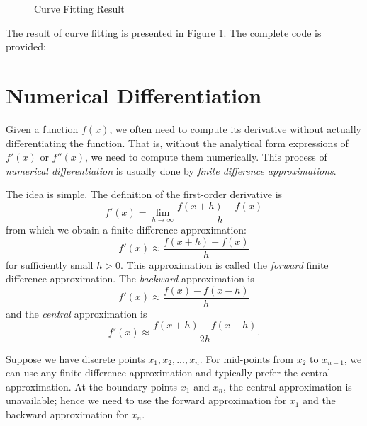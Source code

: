 \begin{figure}
\caption{Curve Fitting Result \label{fig:curve_fit}}
\end{figure}

The result of curve fitting is presented in Figure \ref{fig:curve_fit}. The complete code is provided:
\begin{codelisting}
\end{codelisting}






\section{Numerical Differentiation}

Given a function $f(x)$, we often need to compute its derivative without actually differentiating the function. That is, without the analytical form expressions of $f'(x)$ or $f''(x)$, we need to compute them numerically. This process of \emph{numerical differentiation} is usually done by \emph{finite difference approximations}.

The idea is simple. The definition of the first-order derivative is
\[
	f'(x) = \lim_{h \to \infty} \frac{f(x+h)-f(x)}{h}
\]
from which we obtain a finite difference approximation:
\[
	f'(x) \approx \frac{f(x+h)-f(x)}{h}
\]
for sufficiently small $h>0$. This approximation is called the \emph{forward} finite difference approximation. The \emph{backward} approximation is
\[
	f'(x) \approx \frac{f(x)-f(x-h)}{h}
\]
and the \emph{central} approximation is
\[
	f'(x) \approx \frac{f(x+h)-f(x-h)}{2h}.
\]

Suppose we have discrete points $x_1, x_2, ..., x_n$. For mid-points from $x_2$ to $x_{n-1}$, we can use any finite difference approximation and typically prefer the central approximation. At the boundary points $x_1$ and $x_n$, the central approximation is unavailable; hence we need to use the forward approximation for $x_1$ and the backward approximation for $x_n$.

